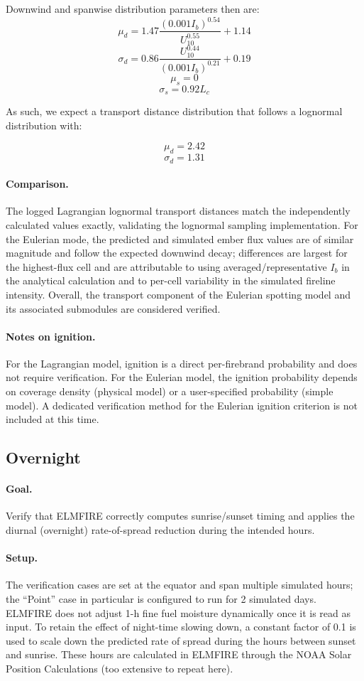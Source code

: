 Downwind and spanwise distribution parameters then are:
\[
\mu_d=1.47\frac{(0.001I_b)^{0.54}}{U_{10}^{0.55}}+1.14
\]
\[
\sigma_d=0.86\frac{U_{10}^{0.44}}{(0.001I_b)^{0.21}}+0.19
\]
\[\mu_s=0\]
\[\sigma_s=0.92L_c\]

As such, we expect a transport distance distribution that follows a lognormal distribution with:

\[
\mu_d=2.42
\]
\[
\sigma_d=1.31
\]



\paragraph{Comparison.} The logged Lagrangian lognormal transport distances match the independently calculated values exactly, validating the lognormal sampling implementation. For the Eulerian mode, the predicted and simulated ember flux values are of similar magnitude and follow the expected downwind decay; differences are largest for the highest-flux cell and are attributable to using averaged/representative $I_b$ in the analytical calculation and to per-cell variability in the simulated fireline intensity. Overall, the transport component of the Eulerian spotting model and its associated submodules are considered verified.

\paragraph{Notes on ignition.} For the Lagrangian model, ignition is a direct per-firebrand probability and does not require verification. For the Eulerian model, the ignition probability depends on coverage density (physical model) or a user-specified probability (simple model). A dedicated verification method for the Eulerian ignition criterion is not included at this time.
\clearpage
\subsection{Overnight}

\paragraph{Goal.} Verify that ELMFIRE correctly computes sunrise/sunset timing and applies the diurnal (overnight) rate-of-spread reduction during the intended hours.

\paragraph{Setup.} The verification cases are set at the equator and span multiple simulated hours; the ``Point'' case in particular is configured to run for 2 simulated days. ELMFIRE does not adjust 1-h fine fuel moisture dynamically once it is read as input. To retain the effect of night-time slowing down, a constant factor of 0.1 is used to scale down the predicted rate of spread during the hours between sunset and sunrise. These hours are calculated in ELMFIRE through the NOAA Solar Position Calculations (too extensive to repeat here).

